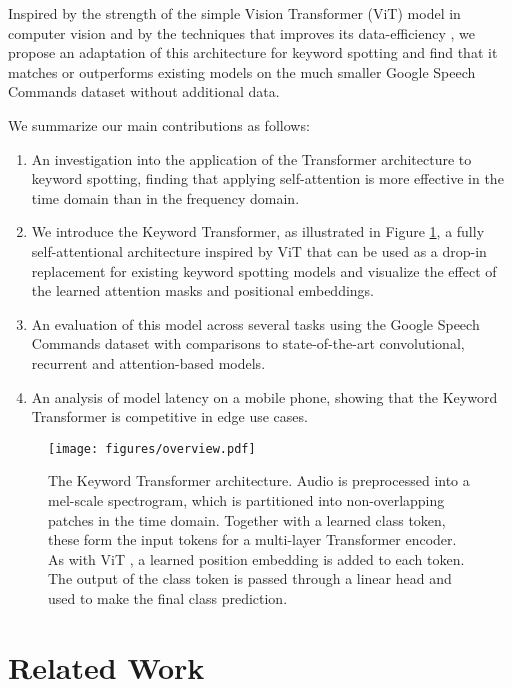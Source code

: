 \documentclass[a4paper]{article}
\begin{document}
Inspired by the strength of the simple Vision Transformer (ViT) model \cite{dosovitskiy2020image} in computer vision and by the techniques that improves its data-efficiency \cite{touvron2020training}, we propose an adaptation of this architecture for keyword spotting and find that it matches or outperforms existing models on the much smaller Google Speech Commands dataset \cite{warden2018speech} without additional data.

We summarize our main contributions as follows:
\begin{enumerate}
\item An investigation into the application of the Transformer architecture to keyword spotting, finding that applying self-attention is more effective in the time domain than in the frequency domain.
\item We introduce the Keyword Transformer, as illustrated in Figure \ref{fig:overview}, a fully self-attentional architecture inspired by ViT \cite{dosovitskiy2020image} that can be used as a drop-in replacement for existing keyword spotting models and visualize the effect of the learned attention masks and positional embeddings.
\item An evaluation of this model across several tasks using the Google Speech Commands dataset with comparisons to state-of-the-art convolutional, recurrent and attention-based models.
\item An analysis of model latency on a mobile phone, showing that the Keyword Transformer is competitive in edge use cases.
\end{enumerate}

\begin{figure}[t]
  \centering
  \texttt{[image: figures/overview.pdf]}
  \caption{The Keyword Transformer architecture. Audio is preprocessed into a mel-scale spectrogram, which is partitioned into non-overlapping patches in the time domain. Together with a learned class token, these form the input tokens for a multi-layer Transformer encoder. As with ViT \cite{dosovitskiy2020image}, a learned position embedding is added to each token. The output of the class token is passed through a linear head and used to make the final class prediction.}
  \label{fig:overview}
\end{figure}

\section{Related Work}
\end{document}
